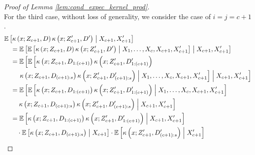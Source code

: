 \begin{proof}[Proof of Lemma \ref{lem:cond_expec_kernel_prod}]
\begin{equation}
    \end{equation}
    For the third case, without loss of generality, we consider the case of $i = j = c+1$.
    \begin{equation}
		\begin{aligned}
			& \E\left[
            \kappa\left(x; Z_{c+1}, D\right)
            \kappa\left(x; Z_{c+1}^{\prime}, D^{\prime}\right) \; \middle| \; X_{c+1}, X_{c+1}^{\prime}\right] \\
			& \quad = \E\left[
                \E\left[
                    \kappa\left(x; Z_{c+1}, D\right)
                    \kappa\left(x; Z_{c+1}^{\prime}, D^{\prime}\right) 
                \; \middle| \; X_{1}, \dotsc, X_{c}, X_{c+1}, X_{c+1}^{\prime}\right]
                \; \middle| \; X_{c+1}, X_{c+1}^{\prime} \right]\\
			& \quad = \E\left[
            \E\left[
                \kappa\left(x; Z_{c+1}, D_{1:(c+1)}\right)
                \kappa\left(x; Z_{c+1}^{\prime}, D^{\prime}_{1:(c+1)}\right) \right. \right. \\
                & \quad \quad \left. \left.
                \kappa\left(x; Z_{c+1}, D_{(c+1):s}\right)
                \kappa\left(x; Z_{c+1}^{\prime}, D^{\prime}_{(c+1):s}\right)
                \; \middle| \; X_{1}, \dotsc, X_{c}, X_{c+1}, X_{c+1}^{\prime}\right]
                \; \middle| \; X_{c+1}, X_{c+1}^{\prime} \right]\\
            & \quad = \E\left[
            \E\left[
                \kappa\left(x; Z_{c+1}, D_{1:(c+1)}\right)
                \kappa\left(x; Z_{c+1}^{\prime}, D^{\prime}_{1:(c+1)}\right) \; \middle| \; X_{1}, \dotsc, X_{c}, X_{c+1}, X_{c+1}^{\prime}\right] \right. \\
                & \quad \quad  \left.
                \kappa\left(x; Z_{c+1}, D_{(c+1):s}\right)
                \kappa\left(x; Z_{c+1}^{\prime}, D^{\prime}_{(c+1):s}\right)
                \; \middle| \; X_{c+1}, X_{c+1}^{\prime} \right]\\
			& \quad = \E\left[
                \kappa\left(x; Z_{c+1}, D_{1:(c+1)}\right)
                \kappa\left(x; Z_{c+1}^{\prime}, D^{\prime}_{1:(c+1)}\right)
                \; \middle| \; X_{c+1}, X_{c+1}^{\prime}\right] \\
                & \quad \quad  
                \cdot \E\left[\kappa\left(x; Z_{c+1}, D_{(c+1):s}\right)\; \middle| \; X_{c+1}\right]
                \cdot \E\left[\kappa\left(x; Z_{c+1}^{\prime}, D^{\prime}_{(c+1):s}\right)\; \middle| \; X_{c+1}^{\prime} \right]

\end{aligned}
\end{equation}
\end{proof}
